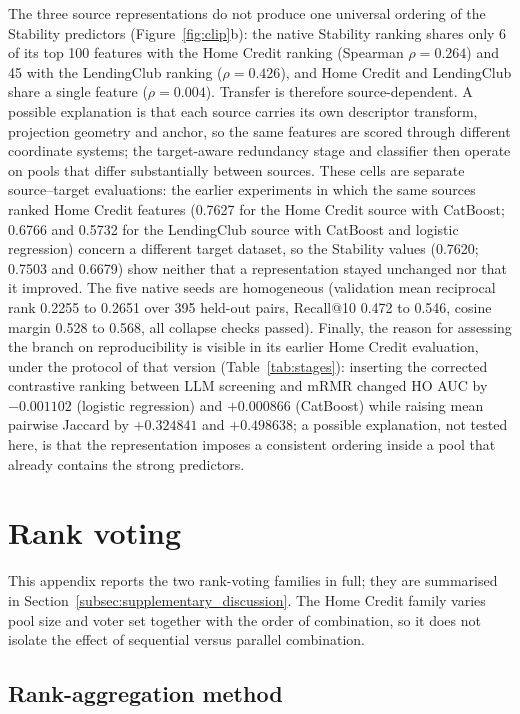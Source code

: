 \documentclass[final,5p,twocolumn]{elsarticle}
\begin{document}
The three source representations do not produce one universal ordering of the Stability predictors (Figure~\ref{fig:clip}b): the native Stability ranking shares only 6 of its top 100 features with the Home Credit ranking (Spearman $\rho=0.264$) and 45 with the LendingClub ranking ($\rho=0.426$), and Home Credit and LendingClub share a single feature ($\rho=0.004$). Transfer is therefore source-dependent. A possible explanation is that each source carries its own descriptor transform, projection geometry and anchor, so the same features are scored through different coordinate systems; the target-aware redundancy stage and classifier then operate on pools that differ substantially between sources. These cells are separate source--target evaluations: the earlier experiments in which the same sources ranked Home Credit features (0.7627 for the Home Credit source with CatBoost; 0.6766 and 0.5732 for the LendingClub source with CatBoost and logistic regression) concern a different target dataset, so the Stability values (0.7620; 0.7503 and 0.6679) show neither that a representation stayed unchanged nor that it improved. The five native seeds are homogeneous (validation mean reciprocal rank 0.2255 to 0.2651 over 395 held-out pairs, Recall@10 0.472 to 0.546, cosine margin 0.528 to 0.568, all collapse checks passed). Finally, the reason for assessing the branch on reproducibility is visible in its earlier Home Credit evaluation, under the protocol of that version (Table~\ref{tab:stages}): inserting the corrected contrastive ranking between LLM screening and mRMR changed HO AUC by $-0.001102$ (logistic regression) and $+0.000866$ (CatBoost) while raising mean pairwise Jaccard by $+0.324841$ and $+0.498638$; a possible explanation, not tested here, is that the representation imposes a consistent ordering inside a pool that already contains the strong predictors.

\section{Rank voting}
\label{app:voting}
\setcounter{table}{0}\setcounter{figure}{0}

This appendix reports the two rank-voting families in full; they are summarised in Section~\ref{subsec:supplementary_discussion}. The Home Credit family varies pool size and voter set together with the order of combination, so it does not isolate the effect of sequential versus parallel combination.

\subsection{Rank-aggregation method}
\label{subsec:voting_fs}
\end{document}
